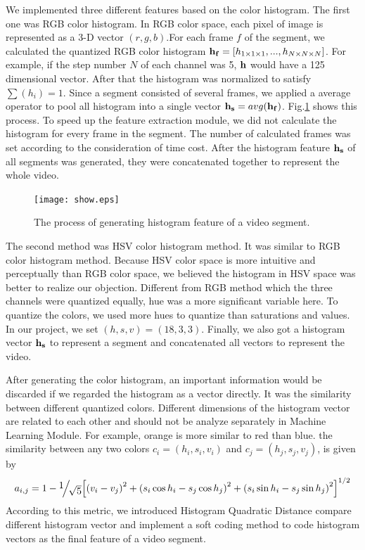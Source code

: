 \documentclass{report}
\begin{document}
We implemented three different features based on the color histogram. The first one was RGB color histogram. In RGB color space, each pixel of image is represented as a 3-D vector $(r, g, b)$.For each frame $f$ of the segment, we calculated the quantized RGB color histogram ${\bf{h}_f} = [{h_{1\times1\times1}},...,{h_{N\times N\times N}}]$. For example, if the step number $N$ of each channel was 5, ${\bf{h}}$ would have a 125 dimensional vector. After that the histogram was normalized to satisfy $\sum({h_i}) = 1$.  Since a segment consisted of several frames, we applied a average operator to pool all histogram into a single vector ${\bf{h}_s} = avg(\bf{h}_f)$. Fig.\ref{fig:histo} shows this process. To speed up the feature extraction module, we did not calculate the histogram for every frame in the segment. The number of calculated frames was set according to the consideration of time cost. After the histogram feature ${\bf{h}_s}$ of all segments was generated, they were concatenated together to represent the whole video.

\begin{figure}[htb]
\centering
\texttt{[image: show.eps]}
\caption{The process of generating histogram feature of a video segment.}
\label{fig:histo}
\end{figure}

The second method was HSV color histogram method. It was similar to RGB color histogram method. Because HSV color space is more intuitive and perceptually than RGB color space, we believed the histogram in HSV space was better to realize our objection. Different from RGB method which the three channels were quantized equally, hue was a more significant variable here. To quantize the colors, we used more hues to quantize than saturations and values. In our project, we set $(h, s, v) = (18, 3, 3)$. Finally, we also got a histogram vector ${\bf{h}_s}$ to represent a segment and concatenated all vectors to represent the video.

After generating the color histogram, an important information would be discarded if we regarded the histogram as a vector directly. It was the similarity between different quantized colors. Different dimensions of the histogram vector are related to each other and should not be analyze separately in Machine Learning Module. For example, orange is more similar to red than blue. the similarity between any two colors $c_i = (h_i, s_i, v_i)$ and $c_j = (h_j, s_j, v_j)$, is given by \[{a_{i,j}} = 1 - {\raise0.7ex\hbox{$1$} \!\mathord{\left/
 {\vphantom {1 {\sqrt 5 }}}\right.\kern-\nulldelimiterspace}
\!\lower0.7ex\hbox{${\sqrt 5 }$}}{\left[ {{{({v_i} - {v_j})}^2} + {{({s_i}\cos {h_i} - {s_j}\cos {h_j})}^2} + {{({s_i}\sin {h_i} - {s_j}\sin {h_j})}^2}} \right]^{1/2}}\]
According to this metric, we introduced Histogram Quadratic Distance compare different histogram vector and implement a soft coding method to code histogram vectors as the final feature of a video segment.
\end{document}
